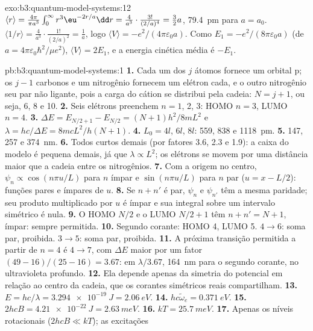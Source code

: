 \begin{solution}{exo:b3:quantum-model-systems:12}
$\langle r\rangle = \frac{4\pi}{\pi a^3}\int_0^\infty r^3\eu^{-2r/a}\dd r =
\frac{4}{a^3}\cdot\frac{3!}{(2/a)^4} = \frac32a$, \qty{79.4}{pm} para $a = a_0$.
$\langle 1/r\rangle = \frac{4}{a^3}\cdot\frac{1!}{(2/a)^2} = \frac1a$, logo
$\langle V\rangle = -e^2/(4\pi\varepsilon_0a)$. Como $E_1 =
-e^2/(8\pi\varepsilon_0a)$ (de $a = 4\pi\varepsilon_0\hbar^2/\mu e^2$),
$\langle V\rangle = 2E_1$, e a energia cinética média é $-E_1$.
\end{solution}

\begin{solution}{pb:b3:quantum-model-systems:1}
\textbf{1.} Cada um dos $j$ átomos fornece um orbital p; os $j - 1$ carbonos e
um nitrogênio fornecem um elétron cada, e o outro nitrogênio seu par não
ligante, pois a carga do cátion se distribui pela cadeia: $N = j + 1$, ou seja, 6,
8 e 10.
\textbf{2.} Seis elétrons preenchem $n = 1$, 2, 3: HOMO $n = 3$, LUMO $n = 4$.
\textbf{3.} $\Delta E = E_{N/2+1} - E_{N/2} = (N+1)h^2/8mL^2$ e $\lambda =
hc/\Delta E = 8mcL^2/h(N+1)$.
\textbf{4.} $L_0 = 4l$, $6l$, $8l$: 559, 838 e \qty{1118}{pm}.
\textbf{5.} 147, 257 e \qty{374}{nm}.
\textbf{6.} Todos curtos demais (por fatores 3.6, 2.3 e 1.9): a caixa do modelo é
pequena demais, já que $\lambda \propto L^2$; os elétrons se movem por uma
distância maior que a cadeia entre os nitrogênios.
\textbf{7.} Com a origem no centro, $\psi_n \propto \cos(n\pi u/L)$ para
$n$ ímpar e $\sin(n\pi u/L)$ para $n$ par ($u = x - L/2$): funções pares e
ímpares de $u$.
\textbf{8.} Se $n + n'$ é par, $\psi_n$ e $\psi_{n'}$ têm a mesma paridade;
seu produto multiplicado por $u$ é ímpar e sua integral sobre um intervalo
simétrico é nula.
\textbf{9.} O HOMO $N/2$ e o LUMO $N/2 + 1$ têm $n + n' = N + 1$, ímpar: sempre
permitida.
\textbf{10.} Segundo corante: HOMO 4, LUMO 5. $4 \to 6$: soma par, proibida.
$3 \to 5$: soma par, proibida.
\textbf{11.} A próxima transição permitida a partir de $n = 4$ é $4 \to 7$, com
$\Delta E$ maior por um fator $(49 - 16)/(25 - 16) = 3.67$: em $\lambda/3.67$,
\qty{164}{nm} para o segundo corante, no ultravioleta profundo.
\textbf{12.} Ela depende apenas da simetria do potencial em relação ao
centro da cadeia, que os corantes simétricos reais compartilham.
\textbf{13.} $E = hc/\lambda = \qty{3.294e-19}{J} = \qty{2.06}{eV}$.
\textbf{14.} $hc\tilde\omega_e = \qty{0.371}{eV}$.
\textbf{15.} $2hcB = \qty{4.21e-22}{J} = \qty{2.63}{meV}$.
\textbf{16.} $kT = \qty{25.7}{meV}$.
\textbf{17.} Apenas os níveis rotacionais ($2hcB \ll kT$); as excitações

\end{solution}
